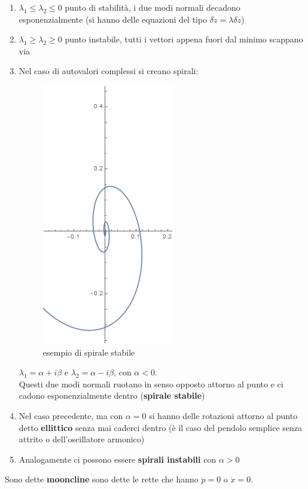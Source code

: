\documentclass[a4paper,12pt]{article}
\theoremstyle{plain}
\theoremstyle{definition}
\theoremstyle{remark}
\begin{document}
\begin{enumerate}
\item $\lambda_1\le\lambda_2\le 0$ punto di stabilità, i due modi normali decadono esponenzialmente (si hanno delle equazioni del tipo $\delta\dot{z}=\lambda \delta z$)
\item $\lambda_1\ge\lambda_2\ge0$ punto instabile, tutti i vettori appena fuori dal minimo scappano via
\item Nel caso di autovalori complessi si creano spirali:

\begin{figure}[h]
	\centering
	\includegraphics[scale=0.4]{stablespiral.png}
	\caption{esempio di spirale stabile}
\end{figure}
 $\lambda_1=\alpha+i\beta$ e $\lambda_2=\alpha-i\beta$, con $\alpha<0$.\\ Questi due modi normali ruotano in senso opposto attorno al punto e ci cadono esponenzialmente dentro (\textbf{spirale stabile})
 
\item Nel caso precedente, ma con $\alpha=0$ si hanno delle rotazioni attorno al punto detto \textbf{ellittico} senza mai caderci dentro (è il caso del pendolo semplice senza attrito o dell'oscillatore armonico)
\item Analogamente ci possono essere \textbf{spirali instabili} con $\alpha>0$
\end{enumerate}
 Sono dette \textbf{mooncline} sono dette le rette che hanno $\dot{p}=0$ o $\dot{x}=0$.
\end{document}
